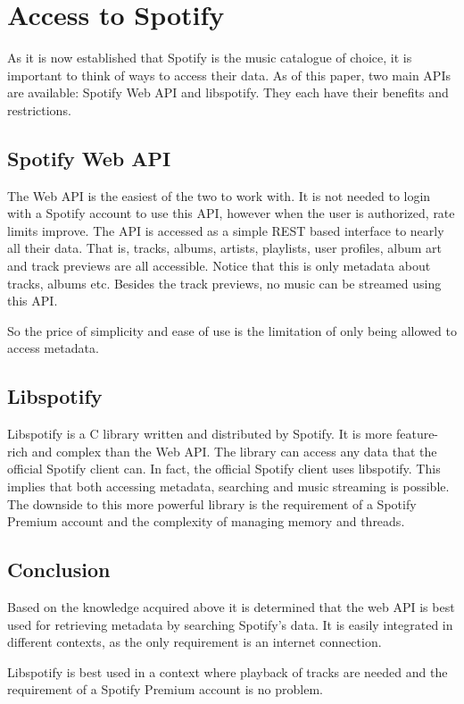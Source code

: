\section{Access to Spotify}
\label{sub:Access_to_Spotify}

As it is now established that Spotify is the music catalogue of choice, it is important to think of ways to access their data. As of this paper, two main APIs are available: Spotify Web API and libspotify. They each have their benefits and restrictions.

\subsection{Spotify Web API}
\label{techPlat:music_catalog_web_api}

The Web API is the easiest of the two to work with. It is not needed to login with a Spotify account to use this API, however when the user is authorized, rate limits improve. The API is accessed as a simple REST based interface to nearly all their data. That is, tracks, albums, artists, playlists, user profiles, album art and track previews are all accessible. Notice that this is only metadata about tracks, albums etc. Besides the track previews, no music can be streamed using this API.

So the price of simplicity and ease of use is the limitation of only being allowed to access metadata.

\subsection{Libspotify}
\label{techPlat:music_catalog_libspotify}

Libspotify is a C library written and distributed by Spotify. It is more feature-rich and complex than the Web API. The library can access any data that the official Spotify client can. In fact, the official Spotify client uses libspotify. This implies that both accessing metadata, searching and music streaming is possible. The downside to this more powerful library is the requirement of a Spotify Premium account and the complexity of managing memory and threads.

\subsection{Conclusion}
\label{ssub:music_catalog_conclusion}

Based on the knowledge acquired above it is determined that the web API is best used for retrieving metadata by searching Spotify's data. It is easily integrated in different contexts, as the only requirement is an internet connection.

Libspotify is best used in a context where playback of tracks are needed and the requirement of a Spotify Premium account is no problem.
